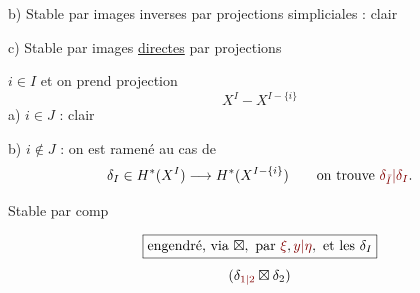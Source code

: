 b) Stable par images inverses par projections
simpliciales : clair \deleted{$\unsure{\longrightarrow}$}

c) Stable par images \uline{directes} par projections

$i\in I$ et on prend projection
\[
X^I\mathbin{-}X^{I-\{i\}}
\]
a) $i\in J$ : clair

b) $i\notin J$ : on est ramené au cas de
\[
\delta_I\in H^*(X^I)\longrightarrow H^*(X^{I-\{i\}})
\qquad\text{on trouve }\unsure{\delta_{\bar I}|\delta_I}.
\]

Stable par comp

\[
\boxed{\text{engendré, via }\boxtimes,\text{ par }\deleted{\unsure{\xi}},
\unsure{y|\eta},\text{ et les }\delta_I}
\]
\[
(\delta_{\unsure{1|2}}\boxtimes\delta_2)
\]
